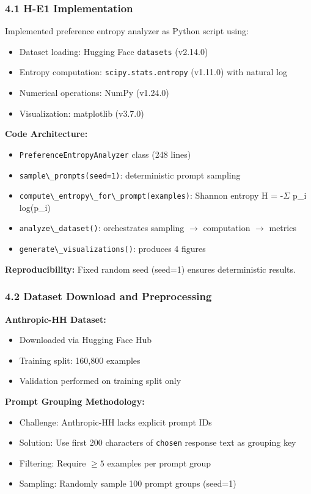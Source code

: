 
\subsubsection{4.1 H-E1 Implementation}

Implemented preference entropy analyzer as Python script using:
\begin{itemize}
\item Dataset loading: Hugging Face \texttt{datasets} (v2.14.0)
\item Entropy computation: \texttt{scipy.stats.entropy} (v1.11.0) with natural log
\item Numerical operations: NumPy (v1.24.0)
\item Visualization: matplotlib (v3.7.0)
\end{itemize}

\textbf{Code Architecture:}
\begin{itemize}
\item \texttt{PreferenceEntropyAnalyzer} class (248 lines)
\item \texttt{sample\textbackslash \_prompts(seed=1)}: deterministic prompt sampling
\item \texttt{compute\textbackslash \_entropy\textbackslash \_for\textbackslash \_prompt(examples)}: Shannon entropy H = -$\Sigma$ p\_i log(p\_i)
\item \texttt{analyze\textbackslash \_dataset()}: orchestrates sampling $\rightarrow$ computation $\rightarrow$ metrics
\item \texttt{generate\textbackslash \_visualizations()}: produces 4 figures
\end{itemize}

\textbf{Reproducibility:} Fixed random seed (seed=1) ensures deterministic results.

\subsubsection{4.2 Dataset Download and Preprocessing}

\textbf{Anthropic-HH Dataset:}
\begin{itemize}
\item Downloaded via Hugging Face Hub
\item Training split: 160,800 examples
\item Validation performed on training split only
\end{itemize}

\textbf{Prompt Grouping Methodology:}
\begin{itemize}
\item Challenge: Anthropic-HH lacks explicit prompt IDs
\item Solution: Use first 200 characters of \texttt{chosen} response text as grouping key
\item Filtering: Require $\geq 5$ examples per prompt group
\item Sampling: Randomly sample 100 prompt groups (seed=1)
\end{itemize}

